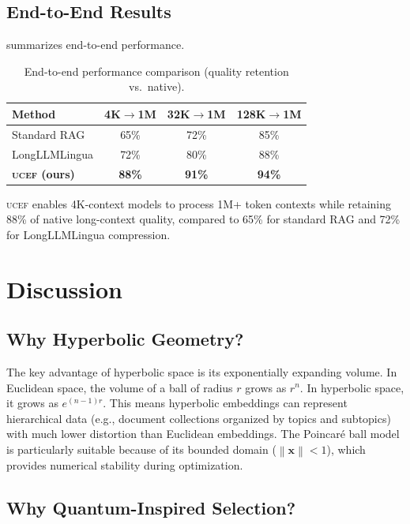 \documentclass[11pt,letterpaper]{article}
\newcommand{\norm}[1]{\left\|#1\right\|}
\newcommand{\ucef}{\textsc{ucef}}
\begin{document}
\subsection{End-to-End Results}

 summarizes end-to-end performance.

\begin{table}[t]
\centering
\caption{End-to-end performance comparison (quality retention vs.\ native).}
\label{tab:e2e}
\small
\begin{tabular}{@{}lccc@{}}
\toprule
Method & 4K$\to$1M & 32K$\to$1M & 128K$\to$1M \\
\midrule
Standard RAG       & 65\% & 72\% & 85\% \\
LongLLMLingua      & 72\% & 80\% & 88\% \\
\textbf{\ucef{} (ours)} & \textbf{88\%} & \textbf{91\%} & \textbf{94\%} \\
\bottomrule
\end{tabular}
\end{table}

\ucef{} enables 4K-context models to process 1M+ token contexts while
retaining 88\% of native long-context quality, compared to 65\% for
standard RAG and 72\% for LongLLMLingua compression.


\section{Discussion}
\label{sec:discussion}

\subsection{Why Hyperbolic Geometry?}

The key advantage of hyperbolic space is its exponentially expanding volume.
In Euclidean space, the volume of a ball of radius $r$ grows as $r^{n}$.
In hyperbolic space, it grows as $e^{(n-1)r}$.  This means hyperbolic
embeddings can represent hierarchical data (e.g., document collections
organized by topics and subtopics) with much lower distortion than Euclidean
embeddings.  The Poincar\'{e} ball model is particularly suitable because
of its bounded domain ($\norm{\mathbf{x}} < 1$), which provides numerical
stability during optimization.

\subsection{Why Quantum-Inspired Selection?}
\end{document}
